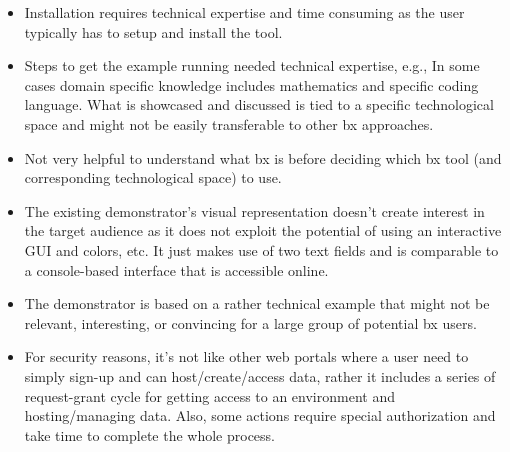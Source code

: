 \begin{itemize}
    \item {Installation requires technical expertise and time consuming as the user typically has to setup and install the tool.}

	\item {Steps to get the example running needed technical expertise, e.g., In some cases domain specific knowledge includes mathematics and specific coding language. What is showcased and discussed is tied to a specific technological space and might not be easily transferable to other bx approaches.}
	
	\item {Not very helpful to understand what bx is before deciding which bx tool (and corresponding technological space) to use.}
	
	\item {The existing demonstrator's visual representation doesn't create interest in the target audience as it does not exploit the potential of using an interactive GUI and colors, etc. It just makes use of two text fields and is comparable to a console-based interface that is accessible online.}
	
	\item {The demonstrator is based on a rather technical example that might not be relevant, interesting, or convincing for a large group of potential bx users.}	
	
	\item {For security reasons, it's not like other web portals where a user need to simply sign-up and can host/create/access data, rather it includes a series of request-grant cycle for getting access to an environment and hosting/managing data. Also, some actions require special authorization and take time to complete the whole process.}

\end{itemize}
